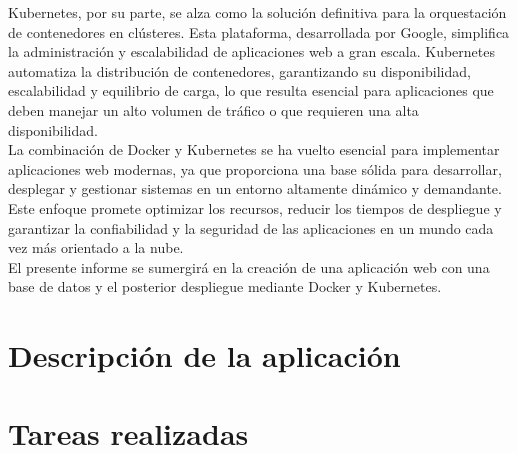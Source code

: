 \documentclass{report}
\begin{document}
        Kubernetes, por su parte, se alza como la solución definitiva para la orquestación de contenedores en clústeres. Esta plataforma, desarrollada por Google, simplifica la administración y escalabilidad de aplicaciones web a gran escala. Kubernetes automatiza la distribución de contenedores, garantizando su disponibilidad, escalabilidad y equilibrio de carga, lo que resulta esencial para aplicaciones que deben manejar un alto volumen de tráfico o que requieren una alta disponibilidad.\\
        
        La combinación de Docker y Kubernetes se ha vuelto esencial para implementar aplicaciones web modernas, ya que proporciona una base sólida para desarrollar, desplegar y gestionar sistemas en un entorno altamente dinámico y demandante. Este enfoque promete optimizar los recursos, reducir los tiempos de despliegue y garantizar la confiabilidad y la seguridad de las aplicaciones en un mundo cada vez más orientado a la nube.\\
        
        El presente informe se sumergirá en la creación de una aplicación web con una base de datos y el posterior despliegue mediante Docker y Kubernetes.
    \chapter{Descripción de la aplicación}
    \chapter{Tareas realizadas}
\end{document}
